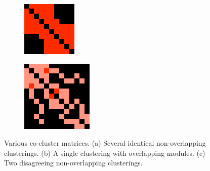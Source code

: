 \begin{figure}[ht]
\begin{subfigure}[b]{0.1\textwidth}
    \includegraphics[width=\textwidth]{overlapping-clust}
    \caption{}
    \label{fig:overlapping-clust}
  \end{subfigure}
  \begin{subfigure}[b]{0.1\textwidth}
    \centering
    \includegraphics[width=\textwidth]{disagreeing-clust}
    \caption{}
    \label{fig:disagreeing-clust}
  \end{subfigure}

  \caption{Various co-cluster matrices. (a) Several identical non-overlapping 
    clusterings. (b) A single clustering with overlapping modules. (c) Two 
    disagreeing non-overlapping clusterings.}
  \label{fig:co-clust}

\end{figure}

